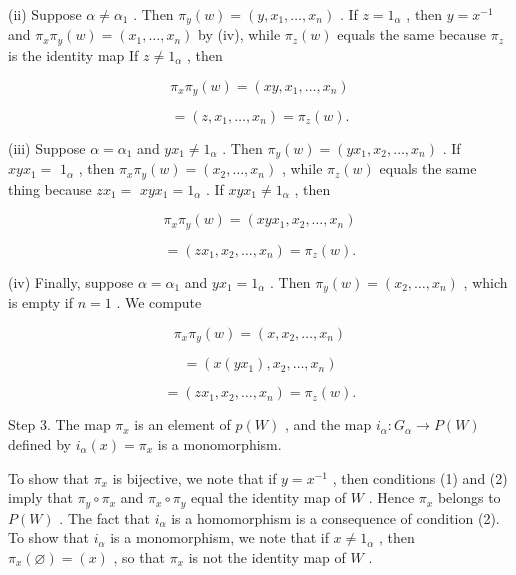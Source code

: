 (ii) Suppose \(\alpha  \neq  {\alpha }_{1}\) . Then \({\pi }_{y}\left( w\right)  = \left( {y,{x}_{1},\ldots ,{x}_{n}}\right)\) . If \(z = {1}_{\alpha }\) , then \(y = {x}^{-1}\) and \({\pi }_{x}{\pi }_{y}\left( w\right)  = \left( {{x}_{1},\ldots ,{x}_{n}}\right)\) by (iv), while \({\pi }_{z}\left( w\right)\) equals the same because \({\pi }_{z}\) is the identity map If \(z \neq  {1}_{\alpha }\) , then

\[
{\pi }_{x}{\pi }_{y}\left( w\right)  = \left( {{xy},{x}_{1},\ldots ,{x}_{n}}\right)
\]

\[
= \left( {z,{x}_{1},\ldots ,{x}_{n}}\right)  = {\pi }_{z}\left( w\right) .
\]

(iii) Suppose \(\alpha  = {\alpha }_{1}\) and \(y{x}_{1} \neq  {1}_{\alpha }\) . Then \({\pi }_{y}\left( w\right)  = \left( {y{x}_{1},{x}_{2},\ldots ,{x}_{n}}\right)\) . If \({xy}{x}_{1} =\)  \({1}_{\alpha }\) , then \({\pi }_{x}{\pi }_{y}\left( w\right)  = \left( {{x}_{2},\ldots ,{x}_{n}}\right)\) , while \({\pi }_{z}\left( w\right)\) equals the same thing because \(z{x}_{1} =\)  \({xy}{x}_{1} = {1}_{\alpha }\) . If \({xy}{x}_{1} \neq  {1}_{\alpha }\) , then

\[
{\pi }_{x}{\pi }_{y}\left( w\right)  = \left( {{xy}{x}_{1},{x}_{2},\ldots ,{x}_{n}}\right)
\]

\[
= \left( {z{x}_{1},{x}_{2},\ldots ,{x}_{n}}\right)  = {\pi }_{z}\left( w\right) .
\]

(iv) Finally, suppose \(\alpha  = {\alpha }_{1}\) and \(y{x}_{1} = {1}_{\alpha }\) . Then \({\pi }_{y}\left( w\right)  = \left( {{x}_{2},\ldots ,{x}_{n}}\right)\) , which is empty if \(n = 1\) . We compute

\[
{\pi }_{x}{\pi }_{y}\left( w\right)  = \left( {x,{x}_{2},\ldots ,{x}_{n}}\right)
\]

\[
= \left( {x\left( {y{x}_{1}}\right) ,{x}_{2},\ldots ,{x}_{n}}\right)
\]

\[
= \left( {z{x}_{1},{x}_{2},\ldots ,{x}_{n}}\right)  = {\pi }_{z}\left( w\right) .
\]

Step 3. The map \({\pi }_{x}\) is an element of \(p\left( W\right)\) , and the map \({i}_{\alpha } : {G}_{\alpha } \rightarrow  P\left( W\right)\) defined by \({i}_{\alpha }\left( x\right)  = {\pi }_{x}\) is a monomorphism.

To show that \({\pi }_{x}\) is bijective, we note that if \(y = {x}^{-1}\) , then conditions (1) and (2) imply that \({\pi }_{y} \circ  {\pi }_{x}\) and \({\pi }_{x} \circ  {\pi }_{y}\) equal the identity map of \(W\) . Hence \({\pi }_{x}\) belongs to \(P\left( W\right)\) . The fact that \({i}_{\alpha }\) is a homomorphism is a consequence of condition (2). To show that \({i}_{\alpha }\) is a monomorphism, we note that if \(x \neq  {1}_{\alpha }\) , then \({\pi }_{x}\left( \varnothing \right)  = \left( x\right)\) , so that \({\pi }_{x}\) is not the identity map of \(W\) .

